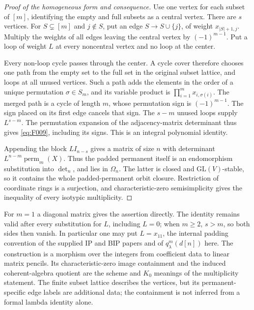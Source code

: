 \begin{proof}[Proof of the homogeneous form and consequence]
Use one vertex for each subset of \([m]\), identifying the empty
and full subsets as a central vertex.  There are \(s\) vertices.
For \(S\subsetneq[m]\) and \(j\notin S\), put an edge
\(S\to S\cup\{j\}\), of weight \(x_{|S|+1,j}\).
Multiply the weights of all edges leaving the central vertex
by \((-1)^{m-1}\).  Put a loop of weight \(L\) at every
noncentral vertex and no loop at the center.

Every non-loop cycle passes through the center.  A cycle cover
therefore chooses one path from the empty set to the full set
in the original subset lattice, and loops at all unused vertices.
Such a path adds the elements in the order of a unique permutation
\(\sigma\in S_m\), and its variable product is
\(\prod_{i=1}^m x_{i,\sigma(i)}\).
The merged path is a cycle of length \(m\), whose permutation
sign is \((-1)^{m-1}\).  The sign placed on its first edge
cancels that sign.  The \(s-m\) unused loops supply
\(L^{s-m}\).  The permutation expansion of the adjacency-matrix
determinant thus gives \eqref{eq:F009}, including its signs.
This is an integral polynomial identity.

Appending the block \(L I_{n-s}\) gives a matrix of size \(n\)
with determinant \(L^{n-m}\operatorname{perm}_m(X)\).
Thus the padded permanent itself is an endomorphism substitution
into \(\det_n\), and lies in \(\Omega_n\).  The latter is closed
and \(\mathrm{GL}(V)\)-stable, so it contains the whole
padded-permanent orbit closure.  Restriction of coordinate rings
is a surjection, and characteristic-zero semisimplicity gives
the inequality of every isotypic multiplicity.
\end{proof}

For \(m=1\) a diagonal matrix gives the assertion directly.
The identity remains valid after every substitution for \(L\),
including \(L=0\); when \(m\geq2\), \(s>m\), so both sides
then vanish. In particular one may put \(L=x_{11}\), the internal
padding convention of the supplied IP and BIP papers and of
\(q^m_\lambda(d[n])\) here. The construction is a morphism over the integers
from coefficient data to linear matrix pencils.  Its characteristic-zero
image containment and the induced coherent-algebra quotient are
the scheme and \(K_0\) meanings of the multiplicity statement.
The finite subset lattice describes the vertices, but its
permanent-specific edge labels are additional data; the containment
is not inferred from a formal lambda identity alone.

